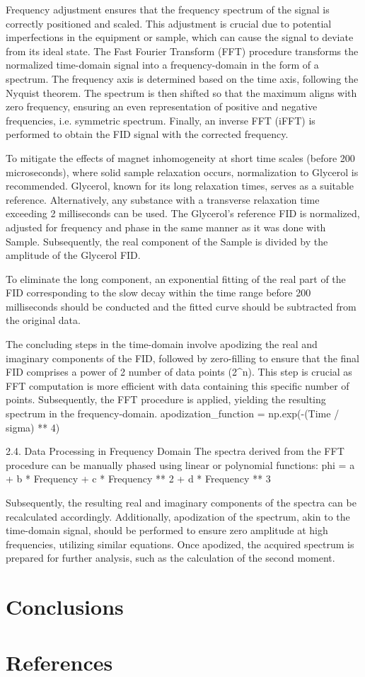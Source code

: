 \documentclass[a4paper,12pt]{article}
\begin{document}
Frequency adjustment ensures that the frequency spectrum of the signal is correctly positioned and scaled. This adjustment is crucial due to potential imperfections in the equipment or sample, which can cause the signal to deviate from its ideal state. The Fast Fourier Transform (FFT) procedure transforms the normalized time-domain signal into a frequency-domain in the form of a spectrum. The frequency axis is determined based on the time axis, following the Nyquist theorem. The spectrum is then shifted so that the maximum aligns with zero frequency, ensuring an even representation of positive and negative frequencies, i.e. symmetric spectrum. Finally, an inverse FFT (iFFT) is performed to obtain the FID signal with the corrected frequency.

To mitigate the effects of magnet inhomogeneity at short time scales (before 200 microseconds), where solid sample relaxation occurs, normalization to Glycerol is recommended. Glycerol, known for its long relaxation times, serves as a suitable reference. Alternatively, any substance with a transverse relaxation time exceeding 2 milliseconds can be used. The Glycerol's reference FID is normalized, adjusted for frequency and phase in the same manner as it was done with Sample. Subsequently, the real component of the Sample is divided by the amplitude of the Glycerol FID.

To eliminate the long component, an exponential fitting of the real part of the FID corresponding to the slow decay within the time range before 200 milliseconds should be conducted and the fitted curve should be subtracted from the original data.

The concluding steps in the time-domain involve apodizing the real and imaginary components of the FID, followed by zero-filling to ensure that the final FID comprises a power of 2 number of data points (2^n). This step is crucial as FFT computation is more efficient with data containing this specific number of points. Subsequently, the FFT procedure is applied, yielding the resulting spectrum in the frequency-domain.
 apodization_function = np.exp(-(Time / sigma) ** 4)

2.4. Data Processing in Frequency Domain
The spectra derived from the FFT procedure can be manually phased using linear or polynomial functions: 
phi = a + b * Frequency + c * Frequency ** 2 + d * Frequency ** 3

Subsequently, the resulting real and imaginary components of the spectra can be recalculated accordingly. Additionally, apodization of the spectrum, akin to the time-domain signal, should be performed to ensure zero amplitude at high frequencies, utilizing similar equations. Once apodized, the acquired spectrum is prepared for further analysis, such as the calculation of the second moment.


\newpage
\section{Conclusions}

\newpage
\section{References}
\printbibliography
\end{document}

